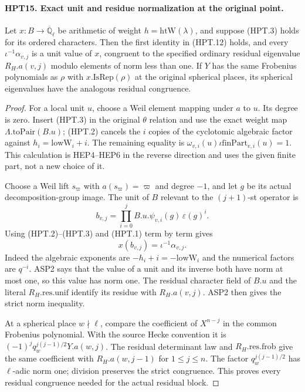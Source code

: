 \documentclass[11pt,a4paper]{article}
\numberwithin{equation}{section}
\theoremstyle{remark}\newtheorem{remark}[theorem]{Remark}
\begin{document}
\paragraph{HPT15. Exact unit and residue normalization at the original point.}
\label{claim:HPT15}
Let $x:B\to\overline{\mathbb Q}_\ell$ be arithmetic of weight
$h=\mathrm{htW}(\lambda)$, and suppose (HPT.3) holds for its
ordered characters.  Then the first identity in (HPT.12) holds,
and every $\iota^{-1}\alpha_{v,j}$ is a unit value of $x$,
congruent to the specified ordinary residual eigenvalue
$R_H.a(v,j)$ modulo elements of norm less than one.
If $Y$ has the same Frobenius polynomials as $\rho$ with
$x.\mathrm{IsRep}(\rho)$ at the original spherical places, its
spherical eigenvalues have the analogous residual congruence.
\begin{proof}
For a local unit $u$, choose a Weil element mapping under $a$
to $u$.  Its degree is zero.  Insert (HPT.3) in the original
$\theta$ relation and use the exact weight map
$\Lambda.\mathrm{toPair}(B.u)$; (HPT.2) cancels the $i$ copies
of the cyclotomic algebraic factor against
$h_i=\mathrm{lowW}_i+i$.  The remaining equality is
$\omega_{v,i}(u)\iota\mathrm{finPart}_{v,i}(u)=1$.
This calculation is HEP4--HEP6 in the reverse direction and uses
the given finite part, not a new choice of it.

Choose a Weil lift $s_\varpi$ with $a(s_\varpi)=\varpi$ and
degree $-1$, and let $g$ be its actual decomposition-group image.
The unit of $B$ relevant to the $(j+1)$-st operator is
\[
             b_{v,j}=\prod_{i=0}^{j}
                          B.u.\psi_{v,i}(g)\,\varepsilon(g)^i.
\]
Using (HPT.2)--(HPT.3) and (HPT.1) term by term gives
\[
                          x(b_{v,j})=\iota^{-1}\alpha_{v,j}.
                                                               \tag{HPT.14}
\]
Indeed the algebraic exponents are $-h_i+i=-\mathrm{lowW}_i$
and the numerical factors are $q^{-i}$.  ASP2 says that the value
of a unit and its inverse both have norm at most one, so this
value has norm one.  The residual character field of $B.u$ and
the literal $R_H.\mathrm{res.unif}$ identify its residue with
$R_H.a(v,j)$.  ASP2 then gives the strict norm inequality.

At a spherical place $w\nmid\ell$, compare the coefficient of
$X^{n-j}$ in the common Frobenius polynomial.  With the source
Hecke convention it is
$(-1)^j q_w^{j(j-1)/2}Y.a(w,j)$.  The residual determinant law
and $R_H.\mathrm{res.frob}$ give the same coefficient with
$R_H.a(w,j-1)$ for $1\leq j\leq n$.  The factor
$q_w^{j(j-1)/2}$ has $\ell$-adic norm one; division preserves
the strict congruence.  This proves every residual congruence
needed for the actual residual block.
\end{proof}
\end{document}
